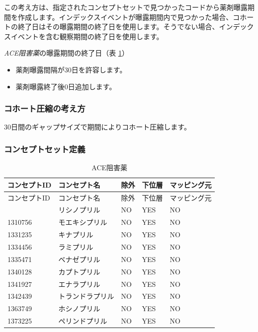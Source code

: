 \documentclass[
  11pt]{book}
\providecommand{\tightlist}{%
  \setlength{\itemsep}{0pt}\setlength{\parskip}{0pt}}
\theoremstyle{definition}
\theoremstyle{definition}
\theoremstyle{definition}
\theoremstyle{definition}
\theoremstyle{remark}
\begin{document}
この考え方は、指定されたコンセプトセットで見つかったコードから薬剤曝露期間を作成します。インデックスイベントが曝露期間内で見つかった場合、コホートの終了日はその曝露期間の終了日を使用します。そうでない場合、インデックスイベントを含む観察期間の終了日を使用します。

\emph{ACE阻害薬}の曝露期間の終了日（表 \ref{tab:ACEiUseACE}）

\begin{itemize}
\tightlist
\item
  薬剤曝露間隔が30日を許容します。
\item
  薬剤曝露終了後0日追加します。
\end{itemize}

\subsubsection*{コホート圧縮の考え方}\label{ux30b3ux30dbux30fcux30c8ux5727ux7e2eux306eux8003ux3048ux65b9-6}

30日間のギャップサイズで期間によりコホート圧縮します。

\subsubsection*{コンセプトセット定義}\label{ux30b3ux30f3ux30bbux30d7ux30c8ux30bbux30c3ux30c8ux5b9aux7fa9-6}

\begin{longtable}[]{@{}lllll@{}}
\caption{\label{tab:ACEiUseACE} ACE阻害薬}\tabularnewline
\toprule\noalign{}
コンセプトID & コンセプト名 & 除外 & 下位層 & マッピング元 \\
\midrule\noalign{}
\endfirsthead
\toprule\noalign{}
コンセプトID & コンセプト名 & 除外 & 下位層 & マッピング元 \\
\midrule\noalign{}
\endhead
\bottomrule\noalign{}
\endlastfoot
1308216 & リシノプリル & NO & YES & NO \\
1310756 & モエキシプリル & NO & YES & NO \\
1331235 & キナプリル & NO & YES & NO \\
1334456 & ラミプリル & NO & YES & NO \\
1335471 & ベナゼプリル & NO & YES & NO \\
1340128 & カプトプリル & NO & YES & NO \\
1341927 & エナラプリル & NO & YES & NO \\
1342439 & トランドラプリル & NO & YES & NO \\
1363749 & ホシノプリル & NO & YES & NO \\
1373225 & ペリンドプリル & NO & YES & NO \\
\end{longtable}
\end{document}
